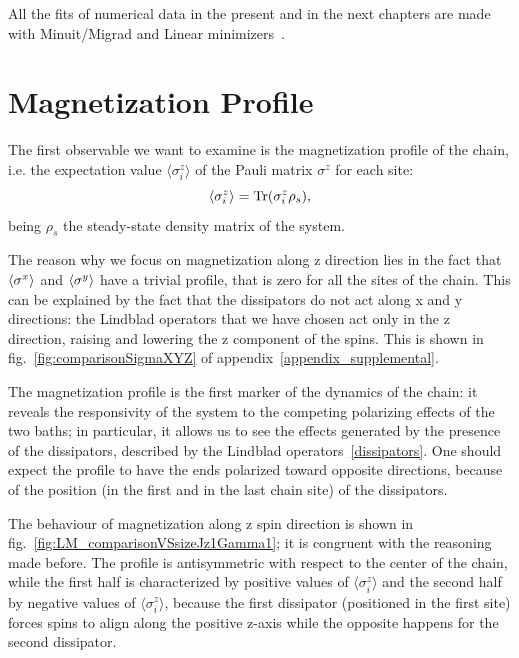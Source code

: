 
All the fits of numerical data in the present and in the next chapters are made with Minuit/Migrad and Linear minimizers~\cite{root_cern}.

\section{Magnetization Profile}
\label{sec:magn_profile}
The first observable we want to examine is the magnetization profile of the chain, i.e. the expectation value $\langle \sigma_i^z \rangle$ of the Pauli matrix $\sigma^z$ for each site:
\begin{equation*}
    \langle \sigma_i^z \rangle = \operatorname{Tr}(\sigma_i^z \rho_s),
\end{equation*}
being $\rho_s$ the steady-state density matrix of the system.

The reason why we focus on magnetization along z direction lies in the fact that $\braket{\sigma^x}$ and $\braket{\sigma^y}$ have a trivial profile, that is zero for all the sites of the chain. This can be explained by the fact that the dissipators do not act along x and y directions: the Lindblad operators that we have chosen act only in the z direction, raising and lowering the z component of the spins. This is shown in fig.~\ref{fig:comparisonSigmaXYZ} of appendix~\ref{appendix_supplemental}.

The magnetization profile is the first marker of the dynamics of the chain:  it reveals the responsivity of the system to the competing polarizing effects of the two baths; in particular, it allows us to see the effects generated by the presence of the dissipators, described by the Lindblad operators~\ref{dissipators}. One should expect the profile to have the ends polarized toward opposite directions, because of the position (in the first and in the last chain site) of the dissipators.

The behaviour of magnetization along z spin direction is shown in fig.~\ref{fig:LM_comparisonVSsizeJz1Gamma1}; it is congruent with the reasoning made before. The profile is antisymmetric with respect to the center of the chain, while the first half is characterized by positive values of  $\langle \sigma_i^z \rangle$ and the second half by negative values of $\langle \sigma_i^z \rangle$, because the first dissipator (positioned in the first site) forces spins to align along the positive z-axis while the opposite happens for the second dissipator.


